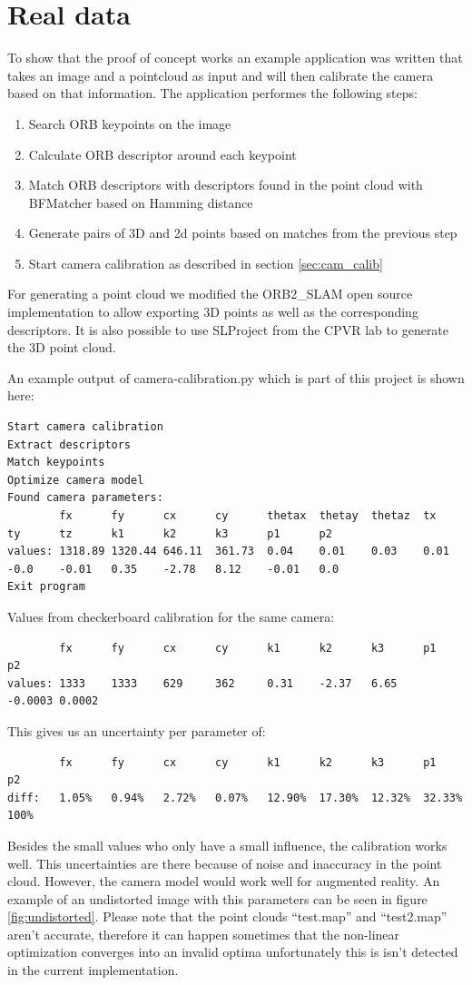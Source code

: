 \documentclass[11pt,a4paper,titlepage,oneside]{report}
\begin{document}
\section{Real data}
To show that the proof of concept works an example application was written that takes an image and a pointcloud as input and will then calibrate the camera based on that information. The application performes the following steps:
\begin{enumerate}
	\item Search ORB keypoints on the image
	\item Calculate ORB descriptor around each keypoint
	\item Match ORB descriptors with descriptors found in the point cloud with BFMatcher \cite{BFMatcher} based on Hamming distance
	\item Generate pairs of 3D and 2d points based on matches from the previous step
	\item Start camera calibration as described in section \ref{sec:cam_calib}
\end{enumerate}
For generating a point cloud we modified the ORB2\_SLAM open source implementation \cite{orbslam2_impl} to allow exporting 3D points as well as the corresponding descriptors. It is also possible to use SLProject from the CPVR lab to generate the 3D point cloud.

An example output of camera-calibration.py which is part of this project is shown here:
\tiny
\begin{lstlisting}
Start camera calibration
Extract descriptors
Match keypoints
Optimize camera model
Found camera parameters:
        fx      fy      cx      cy      thetax  thetay  thetaz  tx      ty      tz      k1      k2      k3      p1      p2
values: 1318.89 1320.44 646.11  361.73  0.04    0.01    0.03    0.01    -0.0    -0.01   0.35    -2.78   8.12    -0.01   0.0
Exit program
\end{lstlisting}
Values from checkerboard calibration for the same camera:
\begin{lstlisting}
        fx      fy      cx      cy      k1      k2      k3      p1      p2
values: 1333    1333    629     362     0.31    -2.37   6.65    -0.0003 0.0002
\end{lstlisting}
This gives us an uncertainty per parameter of:
\begin{lstlisting}
        fx      fy      cx      cy      k1      k2      k3      p1      p2
diff:   1.05%   0.94%   2.72%   0.07%   12.90%  17.30%  12.32%  32.33% 100%
\end{lstlisting}
\normalsize
Besides the small values who only have a small influence, the calibration works well. This uncertainties are there because of noise and inaccuracy in the point cloud. However, the camera model would work well for augmented reality. An example of an undistorted image with this parameters can be seen in figure \ref{fig:undistorted}. Please note that the point clouds ``test.map'' and ``test2.map'' aren't accurate, therefore it can happen sometimes that the non-linear optimization converges into an invalid optima unfortunately this is isn't detected in the current implementation.
\end{document}
